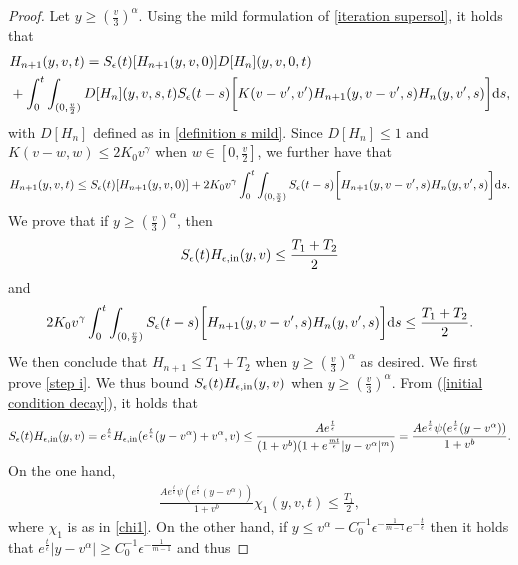 \documentclass[11pt]{article}
\numberwithin{equation}{section}
\newcommand{\der}{\textup{d}}
\begin{document}
\begin{proof}
Let $y\geq (\frac{v}{3})^{\alpha}$. Using the mild formulation of \eqref{iteration supersol}, it holds that
    \begin{align*}
&H_{n+1}(y,v,t)=S_{\epsilon}(t)[H_{n+1}(y,v,0) ] D[H_{n}](y,v,0,t)\\
&+\int_{0}^{t}\int_{(0,\frac{v}{2})}D[H_{n}](y,v,s,t)
S_{\epsilon}(t-s)\bigg[K(v-v',v')H_{n+1}(y,v-v',s) H_{n}(y,v',s)\bigg]\der s,\nonumber 
\end{align*}
with $D[H_{n}]$ defined as in \eqref{definition s mild}. Since $D[H_{n}]\leq 1$ and $K(v-w,w)\leq 2K_{0}v^{\gamma}$ when $w\in[0,\frac{v}{2}]$, we further have that
\begin{align*}
H_{n+1}(y,v,t)\leq S_{\epsilon}(t)[H_{n+1}(y,v,0) ] +2K_{0}v^{\gamma}\int_{0}^{t}\int_{(0,\frac{v}{2})}
S_{\epsilon}(t-s)\bigg[H_{n+1}(y,v-v',s) H_{n}(y,v',s)\bigg]\der s.\nonumber 
\end{align*}
We prove that if $y\geq (\frac{v}{3})^{\alpha}$, then
\begin{align}\label{step i}
S_{\epsilon}(t)H_{\epsilon,\textup{in}}(y,v)\leq \frac{T_{1}+T_{2}}{2}
\end{align}
and 
\begin{align}\label{step ii}
2K_{0}v^{\gamma}\int_{0}^{t}\int_{(0,\frac{v}{2})}
S_{\epsilon}(t-s)\bigg[H_{n+1}(y,v-v',s) H_{n}(y,v',s)\bigg]\der s\leq \frac{T_{1}+T_{2}}{2}.
\end{align}
We then conclude that $H_{n+1}\leq T_{1}+T_{2}$ when $y\geq (\frac{v}{3})^{\alpha}$ as desired. We first prove \eqref{step i}. We thus bound $ S_{\epsilon}(t)H_{\epsilon,\textup{in}}(y,v)$ when $y\geq (\frac{v}{3})^{\alpha}$. From (\ref{initial condition decay}), it holds that
\begin{align*}
     S_{\epsilon}(t)H_{\epsilon,\textup{in}}(y,v)=e^{\frac{t}{\epsilon}}H_{\epsilon,\textup{in}}(e^{\frac{t}{\epsilon}}(y-v^{\alpha})+v^{\alpha},v)\leq \frac{Ae^{\frac{t}{\epsilon}}}{(1+v^{b})(1+e^{\frac{mt}{\epsilon}}|y-v^{\alpha}|^{m})}=\frac{Ae^{\frac{t}{\epsilon}}\psi(e^{\frac{t}{\epsilon}}(y-v^{\alpha}))}{1+v^{b}}.
\end{align*}
On the one hand,
\begin{align*}
\frac{Ae^{\frac{t}{\epsilon}}\psi(e^{\frac{t}{\epsilon}}(y-v^{\alpha}))}{1+v^{b}}\chi_{1}(y,v,t)\leq \frac{T_{1}}{2},
\end{align*}
where $\chi_{1}$ is as in \eqref{chi1}. On the other hand, if  $y\leq v^{\alpha}-C_{0}^{-1}\epsilon^{-\frac{1}{m-1}}  e^{-\frac{t}{\epsilon}}$ then it holds that $e^{\frac{t}{\epsilon}}|y-v^{\alpha}|\geq C_{0}^{-1}\epsilon^{-\frac{1}{m-1}} $ and thus

\end{proof}
\end{document}
